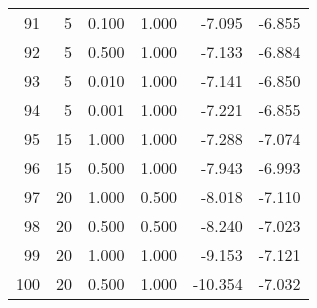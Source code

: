 \begin{tabular}{rrrrrr}
    91 &         5 &  0.100 & 1.000 &                 -7.095 &      -6.855 \\
    92 &         5 &  0.500 & 1.000 &                 -7.133 &      -6.884 \\
    93 &         5 &  0.010 & 1.000 &                 -7.141 &      -6.850 \\
    94 &         5 &  0.001 & 1.000 &                 -7.221 &      -6.855 \\
    95 &        15 &  1.000 & 1.000 &                 -7.288 &      -7.074 \\
    96 &        15 &  0.500 & 1.000 &                 -7.943 &      -6.993 \\
    97 &        20 &  1.000 & 0.500 &                 -8.018 &      -7.110 \\
    98 &        20 &  0.500 & 0.500 &                 -8.240 &      -7.023 \\
    99 &        20 &  1.000 & 1.000 &                 -9.153 &      -7.121 \\
   100 &        20 &  0.500 & 1.000 &                -10.354 &      -7.032 \\
\bottomrule
\end{tabular}
